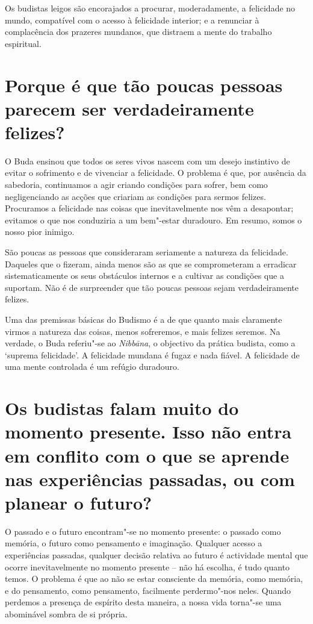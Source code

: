 Os budistas leigos são encorajados a procurar, moderadamente, a
felicidade no mundo, compatível com o acesso à felicidade interior; e a
renunciar à complacência dos prazeres mundanos, que distraem a mente do
trabalho espiritual.

\section{Porque é que tão poucas pessoas parecem ser verdadeiramente felizes?}

O Buda ensinou que todos os seres vivos nascem com um desejo instintivo
de evitar o sofrimento e de vivenciar a felicidade. O problema é que,
por ausência da sabedoria, continuamos a agir criando condições para
sofrer, bem como negligenciando as acções que criariam as condições para
sermos felizes. Procuramos a felicidade nas coisas que inevitavelmente
nos vêm a desapontar; evitamos o que nos conduziria a um bem"-estar
duradouro. Em resumo, somos o nosso pior inimigo.

São poucas as pessoas que consideraram seriamente a natureza da
felicidade. Daqueles que o fizeram, ainda menos são as que se
comprometeram a erradicar sistematicamente os seus obstáculos internos e
a cultivar as condições que a suportam. Não é de surpreender que tão
poucas pessoas sejam verdadeiramente felizes.

Uma das premissas básicas do Budismo é a de que quanto mais claramente
virmos a natureza das coisas, menos sofreremos, e mais felizes seremos.
Na verdade, o Buda referiu"-se ao \emph{Nibbāna}, o objectivo da prática
budista, como a `suprema felicidade'. A felicidade mundana é fugaz e
nada fiável. A felicidade de uma mente controlada é um refúgio
duradouro.

\section{Os budistas falam muito do momento presente. Isso não entra em conflito
  com o que se aprende nas experiências passadas, ou com planear o futuro?}

O passado e o futuro encontram"-se no momento presente: o passado como
memória, o futuro como pensamento e imaginação. Qualquer acesso a
experiências passadas, qualquer decisão relativa ao futuro é actividade
mental que ocorre inevitavelmente no momento presente -- não há escolha,
é tudo quanto temos. O problema é que ao não se estar consciente da
memória, como memória, e do pensamento, como pensamento, facilmente
perdermo"-nos neles. Quando perdemos a presença de espírito desta
maneira, a nossa vida torna"-se uma abominável sombra de si própria.

